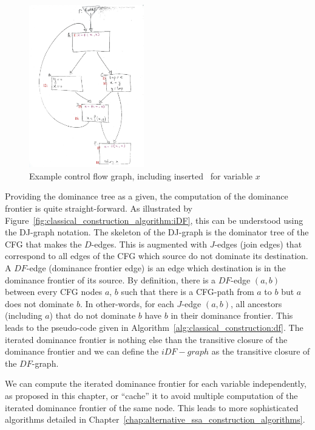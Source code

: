 \begin{figure}
\includegraphics[width=5cm]{ssa_variablex_label.pdf}
\caption{\label{fig:classical_construction_algorithm:examplecfg_varx}Example control flow graph, including
inserted \phiops\ for variable $x$
}
\end{figure}

Providing the dominance tree as a given, the computation of the dominance frontier is quite straight-forward. As illustrated by Figure~\ref{fig:classical_construction_algorithm:iDF}, this can be understood using the DJ-graph notation. The skeleton of the DJ-graph is the dominator tree of the CFG that makes the $D$-edges. This is augmented with $J$-edges (join edges) that correspond to all edges of the CFG which source do not dominate its destination. A $DF$-edge (dominance frontier edge) is an edge which destination is in the dominance frontier of its source. By definition, there is a $DF$-edge $(a,b)$ between every CFG nodes $a$, $b$ such that there is a CFG-path from $a$ to $b$ but $a$ does not dominate $b$. 
In other-words, for each  $J$-edge $(a,b)$, all ancestors (including $a$) that do not dominate $b$ have $b$ in their dominance frontier. This leads to the pseudo-code given in Algorithm~\ref{alg:classical_construction:df}. The iterated dominance frontier is nothing else than the transitive closure of the dominance frontier and we can define the $iDF-graph$ as the transitive closure of the $DF$-graph. 

We can compute the iterated dominance frontier for each variable independently, as proposed in this chapter, or ``cache'' it to avoid multiple computation of the iterated dominance frontier of the same node. This leads to more sophisticated algorithms detailed in Chapter~\ref{chap:alternative_ssa_construction_algorithms}.

